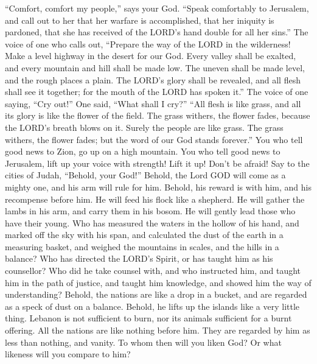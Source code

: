  ``Comfort, comfort my people,'' says your God.
 ``Speak comfortably to Jerusalem, and call out to her
that her warfare is accomplished, that her iniquity is pardoned, that
she has received of the LORD's hand double for all her sins.''
 The voice of one who calls out, ``Prepare the way of the
LORD in the wilderness! Make a level highway in the desert for our God.
 Every valley shall be exalted, and every mountain and
hill shall be made low. The uneven shall be made level, and the rough
places a plain.  The LORD's glory shall be revealed, and
all flesh shall see it together; for the mouth of the LORD has spoken
it.''  The voice of one saying, ``Cry out!'' One said,
``What shall I cry?'' ``All flesh is like grass, and all its glory is
like the flower of the field.  The grass withers, the
flower fades, because the LORD's breath blows on it. Surely the people
are like grass.  The grass withers, the flower fades; but
the word of our God stands forever.''  You who tell good
news to Zion, go up on a high mountain. You who tell good news to
Jerusalem, lift up your voice with strength! Lift it up! Don't be
afraid! Say to the cities of Judah, ``Behold, your God!''
 Behold, the Lord GOD will come as a mighty one, and his
arm will rule for him. Behold, his reward is with him, and his
recompense before him.  He will feed his flock like a
shepherd. He will gather the lambs in his arm, and carry them in his
bosom. He will gently lead those who have their young. 
Who has measured the waters in the hollow of his hand, and marked off
the sky with his span, and calculated the dust of the earth in a
measuring basket, and weighed the mountains in scales, and the hills in
a balance?  Who has directed the LORD's Spirit, or has
taught him as his counsellor?  Who did he take counsel
with, and who instructed him, and taught him in the path of justice, and
taught him knowledge, and showed him the way of understanding?
 Behold, the nations are like a drop in a bucket, and are
regarded as a speck of dust on a balance. Behold, he lifts up the
islands like a very little thing.  Lebanon is not
sufficient to burn, nor its animals sufficient for a burnt offering.
 All the nations are like nothing before him. They are
regarded by him as less than nothing, and vanity.  To
whom then will you liken God? Or what likeness will you compare to him?

